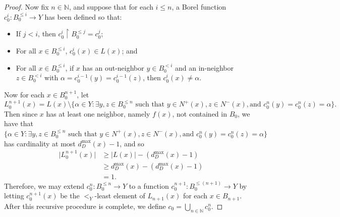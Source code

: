 \documentclass[10pt,a4paper]{amsart}
\newcommand{\N}{\mathbb N}
\begin{document}
\begin{proof}
    Now fix $n \in \N$, and suppose that for each $i \leq n$, a Borel function $c_0^i : B_0^{\leq i} \to Y$ has been defined so that:
    \begin{itemize}
        \item If $j < i$, then $c_0^i \restriction B_0^{\leq j} = c_0^j$;
        \item For all $x \in B_0^{\leq i}$, $c_0^i(x) \in L(x)$; and
        \item For all $x \in B_0^{\leq i}$, if $x$ has an out-neighbor $y \in B_0^{< i}$ and an in-neighbor $z \in B_0^{< i}$ with $\alpha = c_0^{i - 1}(y) = c_0^{i - 1}(z)$, then $c_0^i(x) \neq \alpha$.
    \end{itemize}
    Now for each $x \in B_0^{n + 1}$, let
    $$L_0^{n + 1}(x) = L(x) \setminus \{\alpha \in Y : \exists y, z \in B_0^{\leq n} \text{ such that } y \in N^+(x), z \in N^-(x), \text{and } c_0^n(y) = c_0^n(z) = \alpha \}.$$
    Then since $x$ has at least one neighbor, namely $f(x)$, not contained in $B_0$, we have that $\{\alpha \in Y : \exists y, z \in B_0^{\leq n} \text{ such that } y \in N^+(x), z \in N^-(x), \text{and } c_0^n(y) = c_0^n(z) = \alpha \}$ has cardinality at most $d^{\max}_D(x) - 1$, and so
    \begin{align*}
        \vert L_0^{n + 1}(x) \vert & \geq \vert L(x) \vert - (d^{\max}_D(x) - 1) \\
        & \geq d^{\max}_D(x) - (d^{\max}_D(x) - 1) \\
        & = 1.
    \end{align*}
    Therefore, we may extend $c_0^n : B_0^{\leq n} \to Y$ to a function $c_0^{n + 1} : B_0^{\leq (n + 1)} \to Y$ by letting $c_0^{n + 1}(x)$ be the $<_Y$-least element of $L_{n + 1}(x)$ for each $x \in B_{n + 1}$. After this recursive procedure is complete, we define $c_0 = \bigcup_{n \in \N} c_0^n$.


\end{proof}
\end{document}
